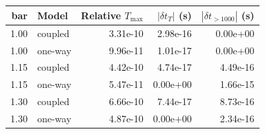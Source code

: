 \begin{tabular}{rlrrr}
\toprule
bar & Model & Relative $T_{\max}$ & $|\delta t_T|$ (s) & $|\delta t_{>1000}|$ (s) \\
\midrule
1.00 & coupled & 3.31e-10 & 2.98e-16 & 0.00e+00 \\
1.00 & one-way & 9.96e-11 & 1.01e-17 & 0.00e+00 \\
1.15 & coupled & 4.42e-10 & 4.74e-17 & 4.49e-16 \\
1.15 & one-way & 5.47e-11 & 0.00e+00 & 1.66e-15 \\
1.30 & coupled & 6.66e-10 & 7.44e-17 & 8.73e-16 \\
1.30 & one-way & 4.87e-10 & 0.00e+00 & 2.34e-16 \\
\bottomrule
\end{tabular}
